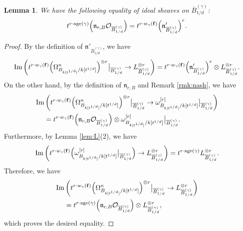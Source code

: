 \documentclass[a4paper,11pt]{amsart}
\newtheorem{lem}[thm]{Lemma}
\theoremstyle{definition}
\theoremstyle{remark}
\begin{document}
\begin{lem}\label{lem:L2}
We have the following equality of ideal sheaves on $\overline{B}^{(\gamma)}_{1/d}$: 
\[
t^{r \cdot \operatorname{age}(\gamma)} \Bigl( \mathfrak{n}_{r,B} \mathcal{O}_{\overline{B}^{(\gamma)}_{1/d}} \Bigr) = t^{r \cdot w_{\gamma}({\bf f})} \Bigl( \mathfrak{n}'_{\overline{B}^{(\gamma)}_{1/d}} \Bigr)^r. 
\]
\end{lem}
\begin{proof}
By the definition of $\mathfrak{n}'_{\overline{B}^{(\gamma)}_{1/d}}$, we have 
\[
\operatorname{Im} \left( 
t^{r \cdot w_{\gamma}({\bf f})} \Bigl (\Omega^n _{B_{k[t^{1/d}]}/k[t^{1/d}]} \Bigr)^{\otimes r} \big|_{\overline{B}^{(\gamma)}_{1/d}} \to L_{\overline{B}^{(\gamma)}_{1/d}} ^{\otimes r}
\right) = t^{r \cdot w_{\gamma}({\bf f})} \Bigl( \mathfrak{n}'_{\overline{B}^{(\gamma)}_{1/d}} \Bigr)^r \otimes L_{\overline{B}^{(\gamma)}_{1/d}} ^{\otimes r}. 
\]
On the other hand, by the definition of $\mathfrak{n}_{r,B}$ and Remark \ref{rmk:nash}, we have 
\begin{align*}
\operatorname{Im} & \left( 
t^{r \cdot w_{\gamma}({\bf f})} \Bigl (\Omega^n _{B_{k[t^{1/d}]}/k[t^{1/d}]} \Bigr)^{\otimes r} \big|_{\overline{B}^{(\gamma)}_{1/d}} 
	\to \omega _{B_{k[t^{1/d}]}/k[t^{1/d}]} ^{[r]} \big|_{\overline{B}^{(\gamma)}_{1/d}}
\right) \\
&= t^{r \cdot w_{\gamma}({\bf f})} \Bigl( \mathfrak{n}_{r,B} \mathcal{O}_{\overline{B}^{(\gamma)}_{1/d}} \Bigr) \otimes \omega _{B_{k[t^{1/d}]}/k[t^{1/d}]} ^{[r]} \big|_{\overline{B}^{(\gamma)}_{1/d}}. 
\end{align*}
Furthermore, by Lemma \ref{lem:L}(2), we have 
\[
\operatorname{Im} \left(
t^{r \cdot w_{\gamma}({\bf f})}  \Bigl( \omega _{B_{k[t^{1/d}]}/k[t^{1/d}]} ^{[r]} \big|_{\overline{B}^{(\gamma)}_{1/d}} \Bigr)
\to L_{\overline{B}^{(\gamma)}_{1/d}} ^{\otimes r}
\right) 
= t^{r \cdot \operatorname{age}(\gamma)} L_{\overline{B}^{(\gamma)}_{1/d}} ^{\otimes r}. 
\]
Therefore, we have 
\begin{align*}
\operatorname{Im} & \left( 
t^{r \cdot w_{\gamma}({\bf f})} \Bigl ( \Omega^n _{B_{k[t^{1/d}]}/k[t^{1/d}]} \Bigr) ^{\otimes r} \big|_{\overline{B}^{(\gamma)}_{1/d}} \to L_{\overline{B}^{(\gamma)}_{1/d}} ^{\otimes r} \right) \\ 
& = t^{r \cdot \operatorname{age}(\gamma)} \Bigl( \mathfrak{n}_{r,B} \mathcal{O}_{\overline{B}^{(\gamma)}_{1/d}} \Bigr) \otimes L_{\overline{B}^{(\gamma)}_{1/d}} ^{\otimes r}, 
\end{align*}
which proves the desired equality. 
\end{proof}
\end{document}
